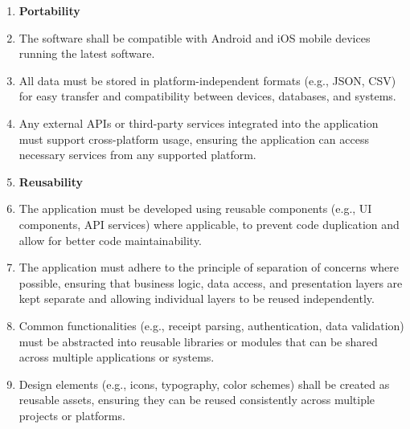\documentclass[12pt]{article}
\begin{document}
\begin{enumerate}[label=NFR\arabic*]
  \item[]  \textbf{Portability}
  \item The software shall be compatible with Android and iOS mobile devices
  running the latest software.
  \item All data must be stored in platform-independent formats (e.g., JSON,
  CSV) for easy transfer and compatibility between devices, databases, and
  systems.
  \item Any external APIs or third-party services integrated into the application must
  support cross-platform usage, ensuring the application can access necessary services
  from any supported platform.


  \item[] \textbf{Reusability} 
  \item The application must be developed using reusable components (e.g., UI
  components, API services) where applicable, to prevent code duplication and
  allow for better code maintainability.
  \item The application must adhere to the principle of separation of concerns
  where possible, ensuring that business logic, data access, and presentation
  layers are kept separate and allowing individual layers to be reused
  independently.
  \item Common functionalities (e.g., receipt parsing, authentication, data
  validation) must be abstracted into reusable libraries or modules that can be
  shared across multiple applications or systems.
  \item Design elements (e.g., icons, typography, color schemes) shall be
  created as reusable assets, ensuring they can be reused consistently across
  multiple projects or platforms.


\end{enumerate}
\end{document}
